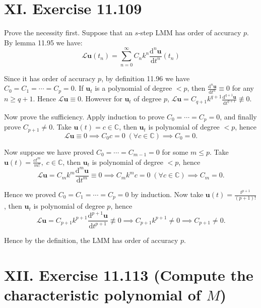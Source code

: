 \documentclass[twoside,a4paper]{article}
\begin{document}
\section*{XI. Exercise 11.109}

\;\;\;\; Prove the necessity first. Suppose that an $s$-step LMM has order of accuracy $p$. By lemma 11.95 we have:
\begin{equation*}
    \mathcal{L}\mathbf{u}(t_n)=\sum_{n=0}^\infty C_nk^n\frac{\text{d}^n \mathbf{u}}{\text{d} t^n} (t_n)
\end{equation*}

Since it has order of accuracy $p$, by definition 11.96 we have $C_0=C_1=\cdots =C_p=0$. If $\mathbf{u}_t$ is a polynomial of degree $<p$, then $\frac{\text{d}^n \mathbf{u}}{\text{d} t^n}\equiv 0$ for any $n\geq q+1$. Hence $\mathcal{L}\mathbf{u}\equiv 0$. However for $\mathbf{u}_t$ of degree $p$, $\mathcal{L}\mathbf{u}=C_{q+1}k^{q+1}\frac{\text{d}^{q+1} \mathbf{u}}{\text{d} t^{q+1}}\not\equiv 0.$

Now prove the sufficiency. Apply induction to prove $C_0=\cdots =C_p=0$, and finally prove $C_{p+1}\neq 0$. Take $\mathbf{u}(t)=c\in\mathbb{C}$, then $\mathbf{u}_t$ is polynomial of degree $<p$, hence
\begin{equation*}
    \mathcal{L}\mathbf{u}\equiv 0\implies C_0c=0\;(\forall c\in\mathbb{C}) \implies C_0=0.
\end{equation*}

Now suppose we have proved $C_0=\cdots=C_{m-1}=0$ for some $m\leq p$. Take $\mathbf{u}(t)=\frac{ct^m}{m!},\;c\in\mathbb{C}$, then $\mathbf{u}_t$ is polynomial of degree $<p$, hence
\begin{equation*}
    \mathcal{L}\mathbf{u}=C_mk^m\frac{\text{d}^m \mathbf{u}}{\text{d} t^m}\equiv 0\implies C_mk^mc=0\;(\forall c\in\mathbb{C}) \implies C_m=0.
\end{equation*}

Hence we proved $C_0=C_1=\cdots =C_p=0$ by induction. Now take $\mathbf{u}(t)=\frac{t^{p+1}}{(p+1)!}$, then $\mathbf{u}_t$ is polynomial of degree $p$, hence
\begin{equation*}
    \mathcal{L}\mathbf{u}=C_{p+1}k^{p+1}\frac{\text{d}^{p+1} \mathbf{u}}{\text{d} t^{p+1}}\not\equiv 0\implies C_{p+1}k^{p+1}\neq 0 \implies C_{p+1}\neq 0.
\end{equation*}

Hence by the definition, the LMM has order of accuracy $p$.

\section*{XII. Exercise 11.113 (Compute the characteristic polynomial of $M$)}
\end{document}
